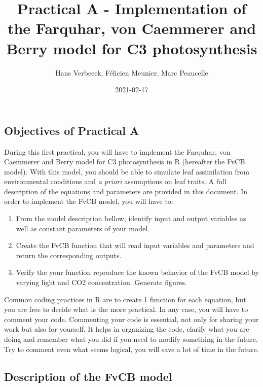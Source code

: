 \documentclass[]{article}
\title{Practical A - Implementation of the Farquhar, von Caemmerer and Berry
model for C3 photosynthesis}
\author{Hans Verbeeck, Félicien Meunier, Marc Peaucelle}
\date{2021-02-17}
\providecommand{\tightlist}{%
  \setlength{\itemsep}{0pt}\setlength{\parskip}{0pt}}
\begin{document}
\maketitle

{
\setcounter{tocdepth}{2}
\tableofcontents
}
\hypertarget{objectives-of-practical-a}{%
\subsection{Objectives of Practical A}\label{objectives-of-practical-a}}

During this first practical, you will have to implement the Farquhar,
von Caemmerer and Berry model for C3 photosynthesis in R (hereafter the
FvCB model). With this model, you should be able to simulate leaf
assimilation from environmental conditions and \emph{a priori}
assumptions on leaf traits. A full description of the equations and
parameters are provided in this document. In order to implement the FvCB
model, you will have to:

\begin{enumerate}
\def\labelenumi{\arabic{enumi}.}
\tightlist
\item
  From the model description bellow, identify input and output variables
  as well as constant parameters of your model.
\item
  Create the FvCB function that will read input variables and parameters
  and return the corresponding outputs.
\item
  Verify the your function reproduce the known behavior of the FvCB
  model by varying light and CO2 concentration. Generate figures.
\end{enumerate}

Common coding practices in R are to create 1 function for each equation,
but you are free to decide what is the more practical. In any case, you
will have to comment your code. Commenting your code is essential, not
only for sharing your work but also for yourself. It helps in organizing
the code, clarify what you are doing and remember what you did if you
need to modify something in the future. Try to comment even what seems
logical, you will save a lot of time in the future.

\hypertarget{description-of-the-fvcb-model}{%
\subsection{Description of the FvCB
model}\label{description-of-the-fvcb-model}}
\end{document}
